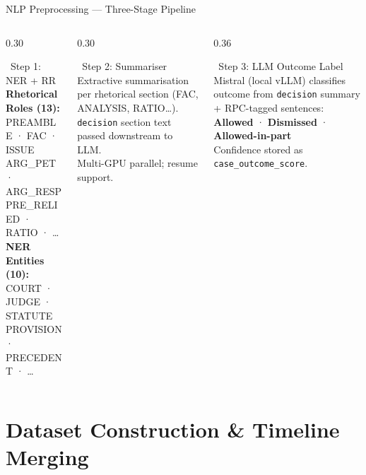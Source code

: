 \documentclass[aspectratio=169, 9pt]{beamer}
\begin{document}
\begin{frame}{NLP Preprocessing — Three-Stage Pipeline}
  \vspace{8pt}
  \begin{columns}[T]
    \begin{column}{0.30\textwidth}
      \begin{block}{\small \faTag\ Step 1: NER + RR}
        \scriptsize
        \textbf{Rhetorical Roles (13):}\\
        PREAMBLE · FAC · ISSUE\\
        ARG\_PET · ARG\_RESP\\
        PRE\_RELIED · RATIO · \ldots\\[4pt]
        \textbf{NER Entities (10):}\\
        COURT · JUDGE · STATUTE\\
        PROVISION · PRECEDENT · \ldots
      \end{block}
    \end{column}
    \begin{column}{0.30\textwidth}
      \begin{block}{\small \faFileAlt\ Step 2: Summariser}
        \scriptsize
        Extractive summarisation per rhetorical section (FAC, ANALYSIS, RATIO\ldots).\\[4pt]
        \texttt{decision} section text passed downstream to LLM.\\[4pt]
        Multi-GPU parallel; resume support.
      \end{block}
    \end{column}
    \begin{column}{0.36\textwidth}
      \begin{block}{\small \faRobot\ Step 3: LLM Outcome Label}
        \scriptsize
        Mistral (local vLLM) classifies outcome from \texttt{decision} summary + RPC-tagged sentences:\\[4pt]
        \textbf{Allowed} · \textbf{Dismissed} · \textbf{Allowed-in-part}\\[4pt]
        Confidence stored as \texttt{case\_outcome\_score}.
      \end{block}
    \end{column}
  \end{columns}
\end{frame}

\section{Dataset Construction \& Timeline Merging}
\end{document}
